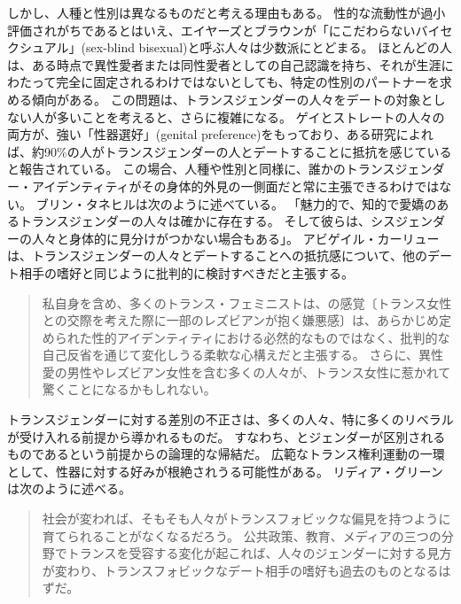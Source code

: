 \documentclass[paper=a4,book,openany]{jlreq} \usepackage{mystyle}
\begin{document}
しかし、人種と性別は異なるものだと考える理由もある。
性的な流動性が過小評価されがちであるとはいえ、エイヤーズとブラウンが「にこだわらないバイセクシュアル」(sex-blind bisexual)と呼ぶ人々は少数派にとどまる。
ほとんどの人は、ある時点で異性愛者または同性愛者としての自己認識を持ち、それが生涯にわたって完全に固定されるわけではないとしても、特定の性別のパートナーを求める傾向がある。
この問題は、トランスジェンダーの人々をデートの対象としない人が多いことを考えると、さらに複雑になる。
ゲイとストレートの人々の両方が、強い「性器選好」(genital preference)をもっており、ある研究によれば、約90\%の人がトランスジェンダーの人とデートすることに抵抗を感じていると報告されている\citep{blair19:_trans_exclus_world_datin}。
この場合、人種や性別と同様に、誰かのトランスジェンダー・アイデンティティがその身体的外見の一側面だと常に主張できるわけではない。
ブリン・タネヒルは次のように述べている。
「魅力的で、知的で愛嬌のあるトランスジェンダーの人々は確かに存在する。
そして彼らは、シスジェンダーの人々と身体的に見分けがつかない場合もある」\citep{tannehill19:_is_refus_date}。
アビゲイル・カーリューは、トランスジェンダーの人々とデートすることへの抵抗感について、他のデート相手の嗜好と同じように批判的に検討すべきだと主張する。

\begin{quote}
私自身を含め、多くのトランス・フェミニストは、の感覚〔トランス女性との交際を考えた際に一部のレズビアンが抱く嫌悪感〕は、あらかじめ定められた性的アイデンティティにおける必然的なものではなく、批判的な自己反省を通じて変化しうる柔軟な心構えだと主張する。
さらに、異性愛の男性やレズビアン女性を含む多くの人々が、トランス女性に惹かれて驚くことになるかもしれない。
\citep{curlew18:_whats_wrong_no}
\end{quote}

トランスジェンダーに対する差別の不正さは、多くの人々、特に多くのリベラルが受け入れる前提から導かれるものだ。
すなわち、とジェンダーが区別されるものであるという前提からの論理的な帰結だ。
広範なトランス権利運動の一環として、性器に対する好みが根絶されうる可能性がある。
リディア・グリーンは次のように述べる。

\begin{quote}
  社会が変われば、そもそも人々がトランスフォビックな偏見を持つように育てられることがなくなるだろう。
公共政策、教育、メディアの三つの分野でトランスを受容する変化が起これば、人々のジェンダーに対する見方が変わり、トランスフォビックなデート相手の嗜好も過去のものとなるはずだ。
\citep{green17:_to_be_effec}
\end{quote}
\end{document}
